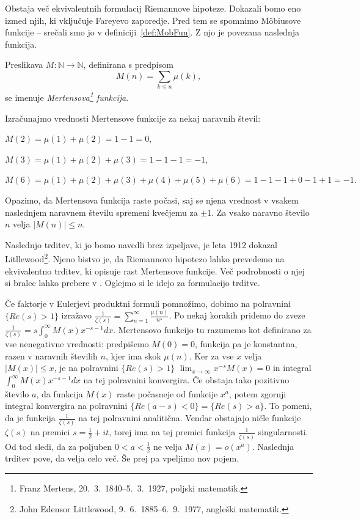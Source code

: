 \documentclass[mat1]{fmfdelo}
\begin{document}
Obstaja več ekvivalentnih formulacij Riemannove hipoteze. Dokazali bomo eno izmed njih, ki vključuje Fareyevo zaporedje. Pred tem se spomnimo M\"obiusove funkcije -- srečali smo jo v definiciji~\ref{def:MobFun}. Z njo je povezana naslednja funkcija.

\begin{definicija}
Preslikava $M \colon \mathbb{N} \to \mathbb{N}$, definirana s predpisom
\begin{equation}
M(n)=\sum_{k\leq n}\mu(k),
\end{equation}
se imenuje \emph{Mertensova\footnote{Franz Mertens, 20.\ 3.\ 1840--5.\ 3.\ 1927, poljski matematik.} funkcija}.
\end{definicija}

\begin{primer}
Izračunajmo vrednosti Mertensove funkcije za nekaj naravnih števil:

\( M(2) = \mu(1) + \mu(2) = 1 - 1 = 0, \)

\( M(3) = \mu(1) + \mu(2) + \mu(3) = 1 - 1 - 1 = -1, \)

\( M(6) = \mu(1) + \mu(2) + \mu(3) + \mu(4) + \mu(5) + \mu(6) = 1 - 1 - 1 + 0 - 1 + 1 = -1. \)
\end{primer}

Opazimo, da Mertensova funkcija raste počasi, saj se njena vrednost v vsakem naslednjem naravnem številu spremeni kvečjemu za $\pm 1$. Za vsako naravno število $n$ velja $|M(n)| \leq n$.

Naslednjo trditev, ki jo bomo navedli brez izpeljave, je leta 1912 dokazal Litllewood\footnote{John Edensor Littlewood, 9.\ 6.\ 1885--6.\ 9.\ 1977, angleški matematik.}. Njeno bistvo je, da Riemannovo hipotezo lahko prevedemo na ekvivalentno trditev, ki opisuje rast Mertensove funkcije. 
Več podrobnosti o njej si bralec lahko prebere v \cite[poglavje 12.1]{zetafunction}.
%
Oglejmo si le idejo za formulacijo trditve.

Če faktorje v Eulerjevi produktni formuli pomnožimo, dobimo na polravnini $\{Re(s)>1\}$ izražavo $ \frac{1}{\zeta(s)} = \sum_{n=1}^{\infty} \frac{\mu(n)}{n^s} $. 
Po nekaj korakih pridemo do zveze $ \frac{1}{\zeta(s)} = s \int_{0}^{\infty} M(x) x^{-s-1}dx $. 
Mertensovo funkcijo tu razumemo kot definirano za vse nenegativne vrednosti: predpišemo $M(0)=0$, funkcija pa je konstantna, razen v naravnih številih $n$, kjer ima skok $\mu(n)$.
Ker za vse $x$ velja $ |M(x)| \leq x $, je na polravnini $\{Re(s)>1\}$ $ \lim_{x \to \infty} x^{-s}M(x) = 0$ in integral $ \int_{0}^{\infty} M(x) x^{-s-1}dx $ na tej polravnini konvergira.
Če obstaja tako pozitivno število $a$, da funkcija $M(x)$ raste počasneje od funkcije $x^{a}$, potem zgornji integral konvergira na polravnini $\{Re(a-s)<0\} = \{Re(s)>a\}$.
To pomeni, da je funkcija $ \frac{1}{\zeta(s)} $ na tej polravnini analitična. 
Vendar obstajajo ničle funkcije $\zeta(s)$ na premici $s = \frac{1}{2}+it $, torej ima na tej premici funkcija $\frac{1}{\zeta(s)}$ singularnosti.
Od tod sledi, da za poljuben $0<a<\frac{1}{2}$ ne velja $M(x) = o(x^{a})$.
Naslednja trditev pove, da velja celo več. Še prej pa vpeljimo nov pojem.
\end{document}
